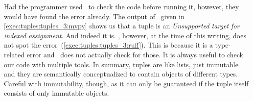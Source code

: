 Had the programmer used \mypy\ to check the code before running it, however, they would have found the error already.
The output of \mypy\ given in \cref{exec:tuples:tuples_3:mypy} shows us that a tuple is an \emph{Unsupported target for indexed assignment}.
And indeed it is.
\ruff, however, at the time of this writing, does not spot the error~(\cref{exec:tuples:tuples_3:ruff}).
This is because it is a type-related error and \ruff\ does not actually check for those.
It is always useful to check our code with multiple tools.%
%
In summary, tuples are like lists, just immutable and they are semantically conceptualized to contain objects of different types.
Careful with immutability, though, as it can only be guaranteed if the tuple itself consists of only immutable objects.%
%
\FloatBarrier%
\endhsection%
%
